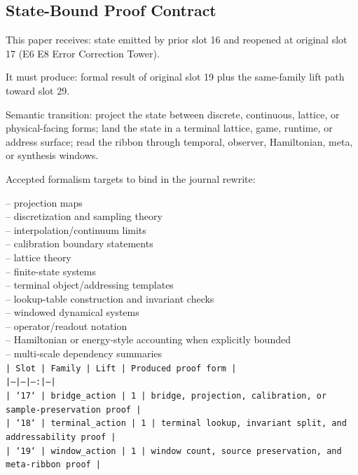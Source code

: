 \documentclass[11pt]{article}
\begin{document}
\subsection*{State-Bound Proof Contract}

This paper receives: state emitted by prior slot 16 and reopened at original slot 17 (E6 E8 Error Correction Tower).

It must produce: formal result of original slot 19 plus the same-family lift path toward slot 29.

Semantic transition: project the state between discrete, continuous, lattice, or physical-facing forms; land the state in a terminal lattice, game, runtime, or address surface; read the ribbon through temporal, observer, Hamiltonian, meta, or synthesis windows.

Accepted formalism targets to bind in the journal rewrite:

\noindent{}-- projection maps\\
\noindent{}-- discretization and sampling theory\\
\noindent{}-- interpolation/continuum limits\\
\noindent{}-- calibration boundary statements\\
\noindent{}-- lattice theory\\
\noindent{}-- finite-state systems\\
\noindent{}-- terminal object/addressing templates\\
\noindent{}-- lookup-table construction and invariant checks\\
\noindent{}-- windowed dynamical systems\\
\noindent{}-- operator/readout notation\\
\noindent{}-- Hamiltonian or energy-style accounting when explicitly bounded\\
\noindent{}-- multi-scale dependency summaries\\

\noindent\texttt{| Slot | Family | Lift | Produced proof form |}\\
\noindent\texttt{|---|---|---:|---|}\\
\noindent\texttt{| `17` | bridge\_action | 1 | bridge, projection, calibration, or sample-preservation proof |}\\
\noindent\texttt{| `18` | terminal\_action | 1 | terminal lookup, invariant split, and addressability proof |}\\
\noindent\texttt{| `19` | window\_action | 1 | window count, source preservation, and meta-ribbon proof |}\\
\end{document}
